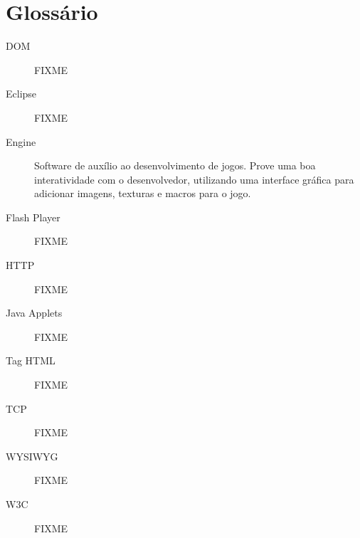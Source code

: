 
\section*{Glossário}

\begin{description}
\item[DOM ] FIXME
\item[Eclipse ] FIXME
\item[Engine ] Software de auxílio ao desenvolvimento de jogos. Prove
uma boa interatividade com o desenvolvedor, utilizando uma interface
gráfica para adicionar imagens, texturas e macros para o jogo.
\item[Flash Player ] FIXME
\item[HTTP ] FIXME
\item[Java Applets ] FIXME
\item[Tag HTML ] FIXME
\item[TCP ] FIXME
\item[WYSIWYG ] FIXME
\item[W3C ] FIXME

\end{description}

\newpage
